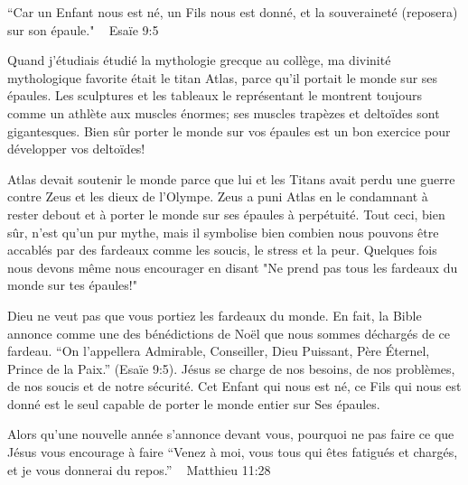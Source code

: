 
“Car un Enfant nous est né, un Fils nous est donné, et la souveraineté (reposera) sur son épaule." ~ Esaïe 9:5

Quand j'étudiais étudié la mythologie grecque au collège, ma divinité mythologique favorite était le titan Atlas, parce qu'il portait le monde sur ses épaules. Les sculptures et les tableaux le représentant le montrent toujours comme un athlète aux muscles énormes; ses muscles trapèzes et deltoïdes sont gigantesques. Bien sûr porter le monde sur vos épaules est un bon exercice pour développer vos deltoïdes!

Atlas devait soutenir le monde parce que lui et les Titans avait perdu une guerre contre Zeus et les dieux de l'Olympe. Zeus a puni Atlas en le condamnant à rester debout et à porter le monde sur ses épaules à perpétuité. Tout ceci, bien sûr, n'est qu'un pur mythe, mais il symbolise bien combien nous pouvons être accablés par des fardeaux comme les soucis, le stress et la peur. Quelques fois nous devons même nous encourager en disant "Ne prend pas tous les fardeaux du monde sur tes épaules!"

Dieu ne veut pas que vous portiez les fardeaux du monde. En fait, la Bible annonce comme une des bénédictions de Noël que nous sommes déchargés de ce fardeau. “On l’appellera Admirable, Conseiller, Dieu Puissant, Père Éternel, Prince de la Paix.” (Esaïe 9:5). Jésus se charge de nos besoins, de nos problèmes, de nos soucis et de notre sécurité. Cet Enfant qui nous est né, ce Fils qui nous est donné est le seul capable de porter le monde entier sur Ses épaules.

Alors qu'une nouvelle année s'annonce devant vous, pourquoi ne pas faire ce que Jésus vous encourage à faire “Venez à moi, vous tous qui êtes fatigués et chargés, et je vous donnerai du repos.” ~ Matthieu 11:28

